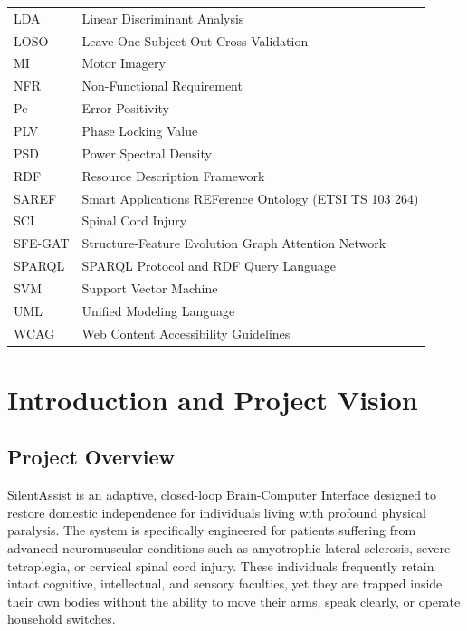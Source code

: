 \documentclass[12pt,a4paper]{report}
\begin{document}
\begin{tabularx}{\textwidth}{@{}p{3.0cm} X@{}}
LDA & Linear Discriminant Analysis \\
LOSO & Leave-One-Subject-Out Cross-Validation \\
MI & Motor Imagery \\
NFR & Non-Functional Requirement \\
Pe & Error Positivity \\
PLV & Phase Locking Value \\
PSD & Power Spectral Density \\
RDF & Resource Description Framework \\
SAREF & Smart Applications REFerence Ontology (ETSI TS 103 264) \\
SCI & Spinal Cord Injury \\
SFE-GAT & Structure-Feature Evolution Graph Attention Network \\
SPARQL & SPARQL Protocol and RDF Query Language \\
SVM & Support Vector Machine \\
UML & Unified Modeling Language \\
WCAG & Web Content Accessibility Guidelines \\
\bottomrule
\end{tabularx}

\newpage
{}
\setcounter{page}{1}

\chapter{Introduction and Project Vision}

\section{Project Overview}
SilentAssist is an adaptive, closed-loop Brain-Computer Interface designed to restore domestic independence for individuals living with profound physical paralysis. The system is specifically engineered for patients suffering from advanced neuromuscular conditions such as amyotrophic lateral sclerosis, severe tetraplegia, or cervical spinal cord injury. These individuals frequently retain intact cognitive, intellectual, and sensory faculties, yet they are trapped inside their own bodies without the ability to move their arms, speak clearly, or operate household switches.
\end{document}
